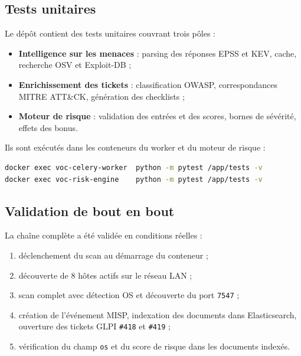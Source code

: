 \subsection{Tests unitaires}

Le d\'ep\^ot contient des tests unitaires couvrant trois p\^oles :

\begin{itemize}[leftmargin=1.6em]
  \item \textbf{Intelligence sur les menaces} : parsing des r\'eponses EPSS
        et KEV, cache, recherche OSV et Exploit-DB ;
  \item \textbf{Enrichissement des tickets} : classification OWASP,
        correspondances MITRE ATT\&CK, g\'en\'eration des checklists ;
  \item \textbf{Moteur de risque} : validation des entr\'ees et des scores,
        bornes de s\'ev\'erit\'e, effets des bonus.
\end{itemize}

Ils sont ex\'ecut\'es dans les conteneurs du worker et du moteur de risque :

\begin{lstlisting}[language=bash,caption={Ex\'ecution des tests}]
docker exec voc-celery-worker  python -m pytest /app/tests -v
docker exec voc-risk-engine    python -m pytest /app/tests -v
\end{lstlisting}

\subsection{Validation de bout en bout}

La cha\^ine compl\`ete a \'et\'e valid\'ee en conditions r\'eelles :

\begin{enumerate}[leftmargin=1.6em]
  \item d\'eclenchement du scan au d\'emarrage du conteneur ;
  \item d\'ecouverte de 8 h\^otes actifs sur le r\'eseau LAN ;
  \item scan complet avec d\'etection OS et d\'ecouverte du port
        \texttt{7547} ;
  \item cr\'eation de l'\'ev\'enement MISP, indexation des documents dans
        Elasticsearch, ouverture des tickets GLPI \texttt{\#418} et
        \texttt{\#419} ;
  \item v\'erification du champ \texttt{os} et du score de risque dans les
        documents index\'es.
\end{enumerate}

